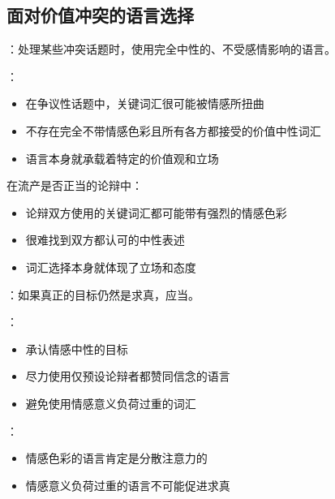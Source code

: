 \subsection{面对价值冲突的语言选择}

\begin{theorembox}[title=价值冲突中的语言困境]
：处理某些冲突话题时，使用完全中性的、不受感情影响的语言。

：
\begin{itemize}
  \item 在争议性话题中，关键词汇很可能被情感所扭曲
  \item 不存在完全不带情感色彩且所有各方都接受的价值中性词汇
  \item 语言本身就承载着特定的价值观和立场
\end{itemize}
\end{theorembox}

\begin{examplebox}[title=流产争议的语言分析]
在流产是否正当的论辩中：
\begin{itemize}
  \item 论辩双方使用的关键词汇都可能带有强烈的情感色彩
  \item 很难找到双方都认可的中性表述
  \item 词汇选择本身就体现了立场和态度
\end{itemize}
\end{examplebox}

\begin{theorembox}[title=务实的解决策略]
：如果真正的目标仍然是求真，应当。

：
\begin{itemize}
  \item 承认情感中性的目标
  \item 尽力使用仅预设论辩者都赞同信念的语言
  \item 避免使用情感意义负荷过重的词汇
\end{itemize}

：
\begin{itemize}
  \item 情感色彩的语言肯定是分散注意力的
  \item 情感意义负荷过重的语言不可能促进求真
\end{itemize}
\end{theorembox}


